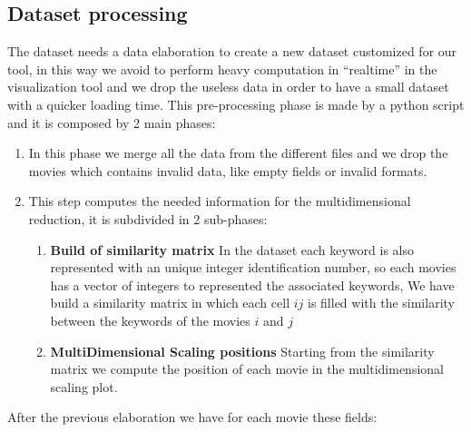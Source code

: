\documentclass[]{article}
\newcommand{\quotes}[1]{``#1''}
\begin{document}
\subsection{Dataset processing}
The dataset needs a data elaboration to create a new dataset customized for our tool, in this way we avoid to perform heavy computation in \quotes{realtime} in the visualization tool and we drop the useless data in order to have a small dataset with a quicker loading time.\newline
This pre-processing phase is made by a python script and it is composed by 2 main phases:
\begin{enumerate}
	\item In this phase we merge all the data from the different files and we drop the movies which contains invalid data, like empty fields or invalid formats.
	\item This step computes the needed information for the multidimensional reduction, it is subdivided in 2 sub-phases:
	\begin{enumerate}
		\item \textbf{Build of similarity matrix}\newline
		In the dataset each keyword is also represented with an unique integer identification number, so each movies has a vector of integers to represented the associated keywords, We have build a similarity matrix in which each cell $ij$ is filled with the similarity between the keywords of the movies $i$ and $j$
		\item \textbf{MultiDimensional Scaling positions}\newline
		Starting from the similarity matrix we compute the position of each movie in the multidimensional scaling plot.
	\end{enumerate}
\end{enumerate}
After the previous elaboration we have for each movie these fields:
\end{document}
